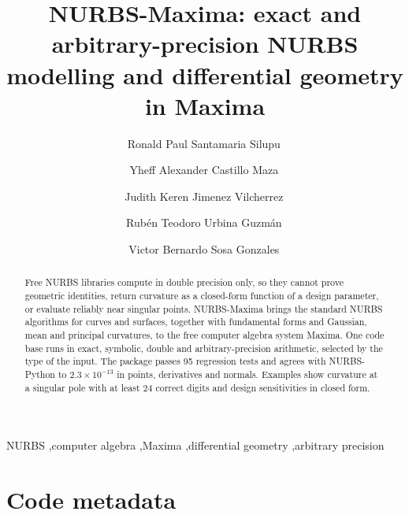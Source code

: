 \documentclass[preprint,12pt]{elsarticle}
\newcommand{\pkg}{NURBS-Maxima}
\begin{document}
\begin{frontmatter}

\title{\pkg: exact and arbitrary-precision NURBS modelling and differential geometry in Maxima}

\author[unp]{Ronald Paul Santamaria Silupu\,}
\author[unp]{Yheff Alexander Castillo Maza\,}
\author[unp]{Judith Keren Jimenez Vilcherrez\,}
\author[unp]{Rubén Teodoro Urbina Guzmán\,}
\author[unp]{Victor Bernardo Sosa Gonzales\,}

\begin{abstract}
Free NURBS libraries compute in double precision only, so they cannot prove geometric identities, return curvature as a closed-form function of a design parameter, or evaluate reliably near singular points. \pkg{} brings the standard NURBS algorithms for curves and surfaces, together with fundamental forms and Gaussian, mean and principal curvatures, to the free computer algebra system Maxima. One code base runs in exact, symbolic, double and arbitrary-precision arithmetic, selected by the type of the input. The package passes 95 regression tests and agrees with NURBS-Python to $2.3\times10^{-13}$ in points, derivatives and normals. Examples show curvature at a singular pole with at least 24 correct digits and design sensitivities in closed form.
\end{abstract}

\begin{keyword}
NURBS \sep computer algebra \sep Maxima \sep differential geometry \sep arbitrary precision
\end{keyword}

\end{frontmatter}

\section*{Code metadata}
\label{sec:metadata}
\end{document}
